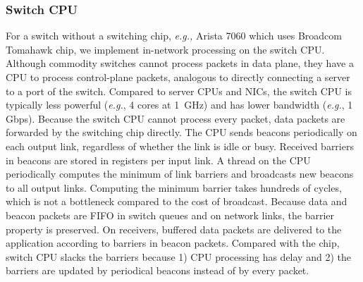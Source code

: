
\subsubsection{Switch CPU}
\label{sec:commodity}

For a switch without a  switching chip, \textit{e.g.,} Arista 7060 which uses Broadcom Tomahawk chip, we implement in-network processing on the switch CPU.
Although commodity switches cannot process packets in data plane, they have a CPU to process control-plane packets, analogous to directly connecting a server to a port of the switch.
Compared to server CPUs and NICs, the switch CPU is typically less powerful (\textit{e.g.}, 4 cores at 1~GHz) and has lower bandwidth (\textit{e.g.}, 1 Gbps).
Because the switch CPU cannot process every packet, data packets are forwarded by the switching chip directly. %
The CPU sends beacons periodically on each output link, regardless of whether the link is idle or busy.
Received barriers in beacons are stored in registers per input link.
A thread on the CPU periodically computes the minimum of link barriers and broadcasts new beacons to all output links.
Computing the minimum barrier takes hundreds of cycles, which is not a bottleneck compared to the cost of broadcast.
Because data and beacon packets are FIFO in switch queues and on network links, the barrier property is preserved. On receivers, buffered data packets are delivered to the application according to barriers in beacon packets.
Compared with the  chip, switch CPU slacks the barriers because 1) CPU processing has delay and 2) the barriers are updated by periodical beacons instead of by every packet.

